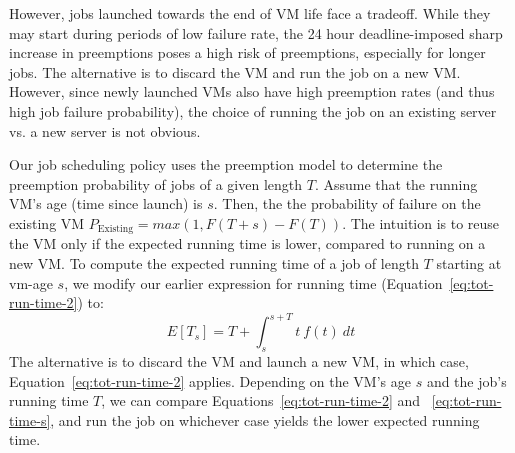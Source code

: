 
However, jobs launched towards the end of VM life face a tradeoff.
While they may start during periods of low failure rate, the 24 hour deadline-imposed sharp increase in preemptions poses a high risk of preemptions, especially for longer jobs.
The alternative is to discard the VM and run the job on a new VM. 
However, since newly launched VMs also have high preemption rates (and thus high job failure probability), the choice of running the job on an existing server vs. a new server is not obvious. 

Our job scheduling policy uses the preemption model to determine the preemption probability of jobs of a given length $T$. 
Assume that the running VM's age (time since launch) is $s$.
Then, the the probability of failure on the existing VM $P_{\text{Existing}} = max(1, F(T+s) - F(T))$. 
The intuition is to reuse the VM only if the expected running time is lower, compared to running on a new VM. 
To compute the expected running time of a job of length $T$ starting at vm-age $s$, we  modify our earlier expression for running time (Equation~\ref{eq:tot-run-time-2}) to: %
\begin{equation}
  \label{eq:tot-run-time-s}
    E[T_s]  = T + \int_{s}^{s+T} t~f(t)~dt
  \end{equation}
  The alternative is to discard the VM and launch a new VM, in which case, Equation~\ref{eq:tot-run-time-2} applies.
Depending on the VM's age $s$ and the job's running time $T$, we can compare Equations~\ref{eq:tot-run-time-2} and ~\ref{eq:tot-run-time-s}, and run the job on whichever case yields the lower expected running time. 

\begin{comment}
Our job scheduling policy uses the preemption model to determine the preemption probability of jobs of a given length $T$. 
Assume that the running VM's age (time since launch) is $s$. 
Then, the the probability of failure on the existing VM $P_{\text{Existing}} = max(1, F(T+s) - F(T))$. 
The alternative is to discard the VM and launch a new VM, in which case, the failure probability is $P_{\text{New}} = F(T)$.
Depending on the VM's age $s$ and the job's running time $T$, we can compare $P_{\text{Existing}}$ and $P_{\text{New}}$, and run the job on whichever case yields the lower failure probability. 
\end{comment}


